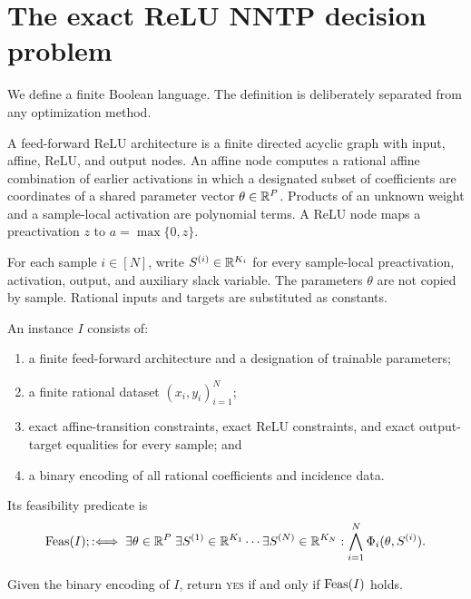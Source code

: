 \section{The exact ReLU NNTP decision problem}
\label{sec:problem}

We define a finite Boolean language.  The definition is deliberately separated
from any optimization method.

\begin{definition}
A feed-forward ReLU architecture is a finite directed acyclic graph with input,
affine, ReLU, and output nodes.  An affine node computes a rational affine
combination of earlier activations in which a designated subset of coefficients
are coordinates of a shared parameter vector \(\theta\in\mathbb{R}^P\).  Products of
an unknown weight and a sample-local activation are polynomial terms.  A ReLU
node maps a preactivation \(z\) to \(a=\max\{0,z\}\).
\end{definition}

For each sample \(i\in[N]\), write \(S^{(i)}\in\mathbb{R}^{K_i}\) for every
sample-local preactivation, activation, output, and auxiliary slack variable.
The parameters \(\theta\) are not copied by sample.  Rational inputs and
targets are substituted as constants.

\begin{definition}
An instance \(I\) consists of:
\begin{enumerate}
  \item a finite feed-forward architecture and a designation of trainable
  parameters;
  \item a finite rational dataset \((x_i,y_i)_{i=1}^N\);
  \item exact affine-transition constraints, exact ReLU constraints, and exact
  output-target equalities for every sample; and
  \item a binary encoding of all rational coefficients and incidence data.
\end{enumerate}
Its feasibility predicate is
\begin{equation}
  \operatorname{Feas}(I);:\Longleftrightarrow\;
  \exists\theta\in\mathbb{R}^P\;
  \exists S^{(1)}\in\mathbb{R}^{K_1}\cdots
  \exists S^{(N)}\in\mathbb{R}^{K_N}:
  \bigwedge_{i=1}^N\Phi_i(\theta,S^{(i)}).
  \label{eq:exact-feasibility}
\end{equation}
\end{definition}

\begin{definition}[\(\ExactNNTP\)]
Given the binary encoding of \(I\), return \textnormal{\textsc{yes}} if and only if
\(\operatorname{Feas}(I)\) holds.
\end{definition}

